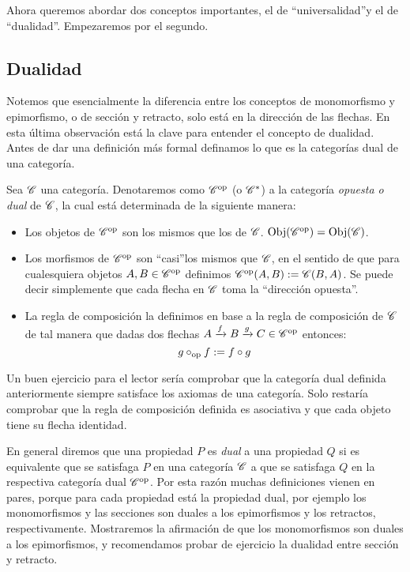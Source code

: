 \documentclass{comunicaciones}
\begin{document}
Ahora queremos abordar dos conceptos importantes, el de \textquotedblleft universalidad\textquotedblright y el de \textquotedblleft dualidad\textquotedblright . Empezaremos por el segundo.

\subsection{Dualidad}
Notemos que esencialmente la diferencia entre los conceptos de monomorfismo y epimorfismo, o de sección y retracto, solo está 
en la dirección de las flechas. En esta última observación está la clave para entender el concepto de dualidad. Antes de dar una definición más formal 
definamos lo que es la categorías dual de una categoría. 

\begin{dfn}
    Sea $\mathscr C$ una categoría. Denotaremos como $\mathscr C^{\mathrm{op}}$ (o $\mathscr C^\ast$) a la categoría \emph{opuesta o dual} de $\mathscr C$, la cual está determinada de la siguiente manera:
    \begin{itemize}
        \item Los objetos de $\mathscr C^{\mathrm{op}}$ son los mismos que los de $\mathscr C$. $\mathrm{Obj}(\mathscr C^{\mathrm{op}})=\mathrm{Obj}(\mathscr C)$.
        \item Los morfismos de $\mathscr C^{\mathrm{op}}$ son \textquotedblleft casi\textquotedblright  los mismos que $\mathscr C$, en el sentido de que para cualesquiera
        objetos $A,B\in\mathscr C^{\mathrm{op}}$ definimos $\mathscr C^{\mathrm{op}}(A,B):=\mathscr C(B,A)$. Se puede decir simplemente que cada flecha en $\mathscr C$ toma la \textquotedblleft dirección opuesta\textquotedblright .
        \item La regla de composición la definimos en base a la regla de composición de $\mathscr C$ de tal manera que dadas dos flechas $A\xrightarrow{f}B\xrightarrow{g}C\in\mathscr C^{\mathrm{op}}$ entonces:
        $$g\circ_{\mathrm{op}} f:=f\circ g$$
    \end{itemize}
\end{dfn}

Un buen ejercicio para el lector sería comprobar que la categoría dual definida anteriormente siempre satisface los axiomas de una categoría. Solo restaría
comprobar que la regla de composición definida es asociativa y que cada objeto tiene su flecha identidad. 

En general diremos que una propiedad $P$ es \emph{dual} a una propiedad $Q$ si es equivalente que se satisfaga $P$ en una categoría $\mathscr C$ a que se satisfaga $Q$
en la respectiva categoría dual $\mathscr C^{\mathrm{op}}$. Por esta razón muchas definiciones vienen en pares, porque para cada propiedad está la propiedad dual, por ejemplo
los monomorfismos y las secciones son duales a los epimorfismos y los retractos, respectivamente. Mostraremos la afirmación de que
los monomorfismos son duales a los epimorfismos, y recomendamos probar de ejercicio la dualidad entre sección y retracto.
\end{document}
